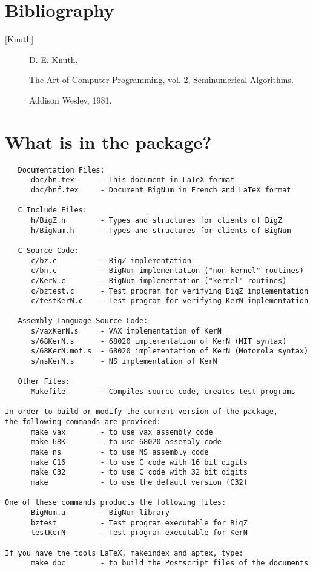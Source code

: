 \vspace{3cm}

\section{Bibliography}
\begin{description}
\item [{[Knuth]}]
D. E. Knuth,
\begin{sf}
The Art of Computer Programming, vol. 2, Seminumerical Algorithms.
\end{sf}
Addison Wesley, 1981.
\end{description}


\clearpage
\appendix

\section{What is in the package?}
\begin{verbatim}
   Documentation Files:
      doc/bn.tex      - This document in LaTeX format
      doc/bnf.tex     - Document BigNum in French and LaTeX format

   C Include Files:
      h/BigZ.h        - Types and structures for clients of BigZ
      h/BigNum.h      - Types and structures for clients of BigNum

   C Source Code:
      c/bz.c          - BigZ implementation
      c/bn.c          - BigNum implementation ("non-kernel" routines)
      c/KerN.c        - BigNum implementation ("kernel" routines)
      c/bztest.c      - Test program for verifying BigZ implementation
      c/testKerN.c    - Test program for verifying KerN implementation

   Assembly-Language Source Code:
      s/vaxKerN.s     - VAX implementation of KerN
      s/68KerN.s      - 68020 implementation of KerN (MIT syntax)
      s/68KerN.mot.s  - 68020 implementation of KerN (Motorola syntax)
      s/nsKerN.s      - NS implementation of KerN

   Other Files:
      Makefile        - Compiles source code, creates test programs

In order to build or modify the current version of the package, 
the following commands are provided:
      make vax        - to use vax assembly code
      make 68K        - to use 68020 assembly code
      make ns         - to use NS assembly code
      make C16        - to use C code with 16 bit digits
      make C32        - to use C code with 32 bit digits 
      make            - to use the default version (C32)

One of these commands products the following files:
      BigNum.a        - BigNum library
      bztest          - Test program executable for BigZ
      testKerN        - Test program executable for KerN

If you have the tools LaTeX, makeindex and aptex, type:
      make doc        - to build the Postscript files of the documents
\end{verbatim}

